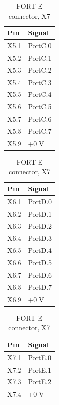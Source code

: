 \documentclass[11pt,a4paper]{article}
\begin{document}
  \begin{table}
    \flushleft
      \begin{minipage}{0.3\textwidth}
        \begin{tabular}[b]{|p{7mm}|p{15mm}|}
          \hline \textbf{Pin} & \textbf{Signal}\\
          \hline X5.1 & PortC.0\\
          \hline X5.2 & PortC.1\\
          \hline X5.3 & PortC.2\\
          \hline X5.4 & PortC.3\\
          \hline X5.5 & PortC.4\\
          \hline X5.6 & PortC.5\\
          \hline X5.7 & PortC.6\\
          \hline X5.8 & PortC.7\\
          \hline X5.9 & +0 V\\
          \hline
        \end{tabular}
        \caption{PORT C connector, X5}
        \vspace{25pt}
      \end{minipage}\hfill
      \begin{minipage}{0.3\textwidth}
        \begin{tabular}[b]{|p{7mm}|p{15mm}|}
          \hline \textbf{Pin} & \textbf{Signal}\\
          \hline X6.1 & PortD.0\\
          \hline X6.2 & PortD.1\\
          \hline X6.3 & PortD.2\\
          \hline X6.4 & PortD.3\\
          \hline X6.5 & PortD.4\\
          \hline X6.6 & PortD.5\\
          \hline X6.7 & PortD.6\\
          \hline X6.8 & PortD.7\\
          \hline X6.9 & +0 V\\
          \hline
        \end{tabular}
        \caption{PORT D connector, X6}
        \vspace{25pt}
      \end{minipage}\hfill
      \begin{minipage}{0.3\textwidth}
        \begin{tabular}[b]{|p{7mm}|p{15mm}|}
          \hline \textbf{Pin} & \textbf{Signal}\\
          \hline X7.1 & PortE.0\\
          \hline X7.2 & PortE.1\\
          \hline X7.3 & PortE.2\\
          \hline X7.4 & +0 V\\
          \hline
        \end{tabular}
        \caption{PORT E connector, X7}
      \end{minipage}\hfill
  \end{table}
\end{document}
